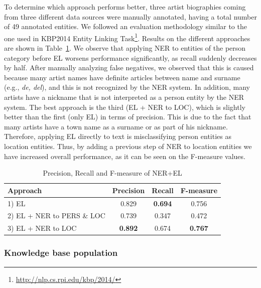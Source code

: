 To determine which approach performs better, three artist biographies coming from three different data sources were manually annotated, having a total number of 49 annotated entities. We followed an evaluation methodology similar to the one used in KBP2014 Entity Linking Task\footnote{\url{http://nlp.cs.rpi.edu/kbp/2014/}}. Results on the different approaches are shown in Table~\ref{tbl:musicology:res1}. We observe that applying NER to entities of the person category before EL worsens performance significantly, as recall suddenly decreases by half. After manually analyzing false negatives, we observed that this is caused because many artist names have definite articles between name and surname (e.g., \textit{de, del}), and this is not recognized by the NER system. In addition, many artists have a nickname that is not interpreted as a person entity by the NER system. The best approach is the third (EL + NER to LOC), which is slightly better than the first (only EL) in terms of precision. This is due to the fact that many artists have a town name as a surname or as part of his nickname. Therefore, applying EL directly to text is misclassifying person entities as location entities. Thus, by adding a previous step of NER to location entities we have increased overall performance, as it can be seen on the F-measure values.

\begin{table}
	\centering
	  \begin{tabular}{  l c c c }
    \hline
    Approach & Precision & Recall & F-measure \\ 
    \hline
    1) EL & 0.829 & \textbf{0.694} & 0.756 \\ 
    2) EL + NER to PERS \& LOC & 0.739 & 0.347 & 0.472 \\
    3) EL + NER to LOC & \textbf{0.892} & 0.674 & \textbf{0.767} \\
    \hline
  \end{tabular}
	\caption{Precision, Recall and F-measure of NER+EL}
	
	\label{tbl:musicology:res1}
\end{table}

\subsubsection{Knowledge base population}
\label{sec:musicology:ie}

